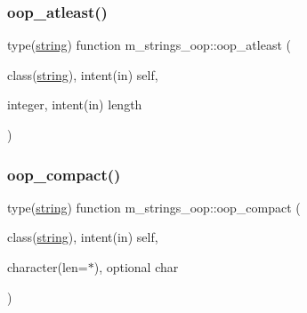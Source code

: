 \mbox{\label{namespacem__strings__oop_a3ee018293cef22d7314b2a9f0c78a319}} 
\subsubsection{\texorpdfstring{oop\+\_\+atleast()}{oop\_atleast()}}
{\footnotesize\ttfamily type(\mbox{\hyperlink{structm__strings__oop_1_1string}{string}}) function m\+\_\+strings\+\_\+oop\+::oop\+\_\+atleast (\begin{DoxyParamCaption}\item[{class(\mbox{\hyperlink{structm__strings__oop_1_1string}{string}}), intent(in)}]{self,  }\item[{integer, intent(in)}]{length }\end{DoxyParamCaption})\hspace{0.3cm}{\ttfamily [private]}}

\mbox{\label{namespacem__strings__oop_ac02aecbaebcf57833b544de4f50c89a6}} 
\subsubsection{\texorpdfstring{oop\+\_\+compact()}{oop\_compact()}}
{\footnotesize\ttfamily type(\mbox{\hyperlink{structm__strings__oop_1_1string}{string}}) function m\+\_\+strings\+\_\+oop\+::oop\+\_\+compact (\begin{DoxyParamCaption}\item[{class(\mbox{\hyperlink{structm__strings__oop_1_1string}{string}}), intent(in)}]{self,  }\item[{character(len=$\ast$), optional}]{char }\end{DoxyParamCaption})\hspace{0.3cm}{\ttfamily [private]}}

\mbox{\label{namespacem__strings__oop_aa1a395d359592720a842054fd0aaff0a}} 
